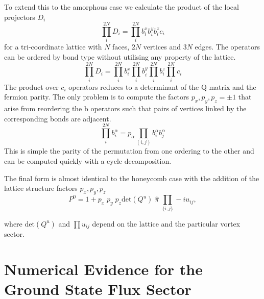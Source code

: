 To extend this to the amorphous case we calculate the product of the local projectors \(D_i\)
\[\prod_i^{2N} D_i = \prod_i^{2N} b^x_i b^y_i b^z_i c_i \]
for a tri-coordinate lattice with \(N\) faces, \(2N\) vertices and \(3N\) edges. The operators can be ordered by bond type without utilising any property of the lattice.
\[\prod_i^{2N} D_i = \prod_i^{2N} b^x_i \prod_i^{2N} b^y_i \prod_i^{2N} b^z_i \prod_i^{2N} c_i\]
The product over \(c_i\) operators reduces to a determinant of the Q matrix and the fermion parity. The only problem is to compute the factors \(p_x,p_y,p_z = \pm1\) that arise from reordering the b operators such that pairs of vertices linked by the corresponding bonds are adjacent.
\[\prod_i^{2N} b^\alpha_i = p_\alpha \prod_{(i,j)}b^\alpha_i b^\alpha_j\]
This is simple the parity of the permutation from one ordering to the other and can be computed quickly with a cycle decomposition.

The final form is almost identical to the honeycomb case with the addition of the lattice structure factors \(p_x,p_y,p_z\)
\[P^0 = 1 + p_x\;p_y\;p_z \mathrm{det}(Q^u) \; \hat{\pi} \; \prod_{\{i,j\}} -iu_{ij},\] 

where \(\mathrm{det}(Q^u)\) and \(\prod u_{ij}\) depend on the lattice and the particular vortex sector. 

\section{Numerical Evidence for the Ground State Flux Sector} \label{apx:ground_state}

